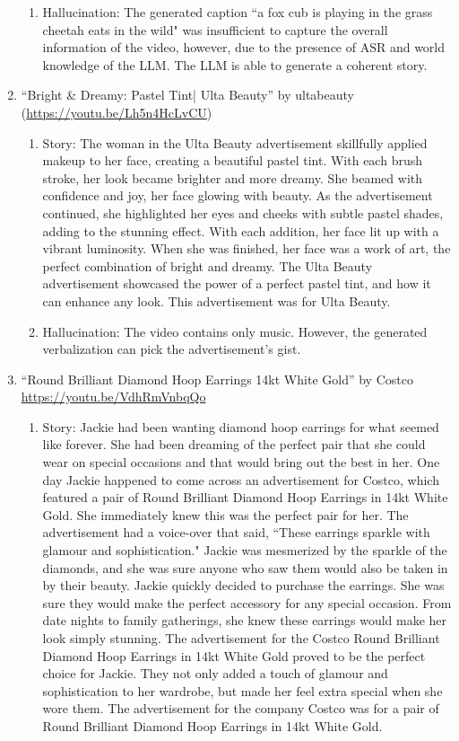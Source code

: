 \begin{enumerate}
\begin{enumerate}
        \item Hallucination: The generated caption ``a fox cub is playing in the grass cheetah eats in the wild" was insufficient to capture the overall information of the video, however, due to the presence of ASR and world knowledge of the LLM. The LLM is able to generate a coherent story. 
    \end{enumerate}

        \item ``Bright \& Dreamy: Pastel Tint| Ulta Beauty'' by ultabeauty (\url{https://youtu.be/Lh5n4HcLvCU}) 
        \begin{enumerate}
            \item Story: The woman in the Ulta Beauty advertisement skillfully applied makeup to her face, creating a beautiful pastel tint. With each brush stroke, her look became brighter and more dreamy. She beamed with confidence and joy, her face glowing with beauty. As the advertisement continued, she highlighted her eyes and cheeks with subtle pastel shades, adding to the stunning effect. With each addition, her face lit up with a vibrant luminosity. When she was finished, her face was a work of art, the perfect combination of bright and dreamy. The Ulta Beauty advertisement showcased the power of a perfect pastel tint, and how it can enhance any look. This advertisement was for Ulta Beauty.

            \item Hallucination: The video contains only music. However, the generated verbalization can pick the advertisement's gist. 
        \end{enumerate}
        
        \item ``Round Brilliant Diamond Hoop Earrings 14kt White Gold'' by Costco \url{https://youtu.be/VdhRmVnbqQo} 
        \begin{enumerate}
            \item Story: Jackie had been wanting diamond hoop earrings for what seemed like forever. She had been dreaming of the perfect pair that she could wear on special occasions and that would bring out the best in her. One day Jackie happened to come across an advertisement for Costco, which featured a pair of Round Brilliant Diamond Hoop Earrings in 14kt White Gold. She immediately knew this was the perfect pair for her. The advertisement had a voice-over that said, “These earrings sparkle with glamour and sophistication." Jackie was mesmerized by the sparkle of the diamonds, and she was sure anyone who saw them would also be taken in by their beauty. Jackie quickly decided to purchase the earrings. She was sure they would make the perfect accessory for any special occasion. From date nights to family gatherings, she knew these earrings would make her look simply stunning. The advertisement for the Costco Round Brilliant Diamond Hoop Earrings in 14kt White Gold proved to be the perfect choice for Jackie. They not only added a touch of glamour and sophistication to her wardrobe, but made her feel extra special when she wore them. The advertisement for the company Costco was for a pair of Round Brilliant Diamond Hoop Earrings in 14kt White Gold.
            

\end{enumerate}
\end{enumerate}
